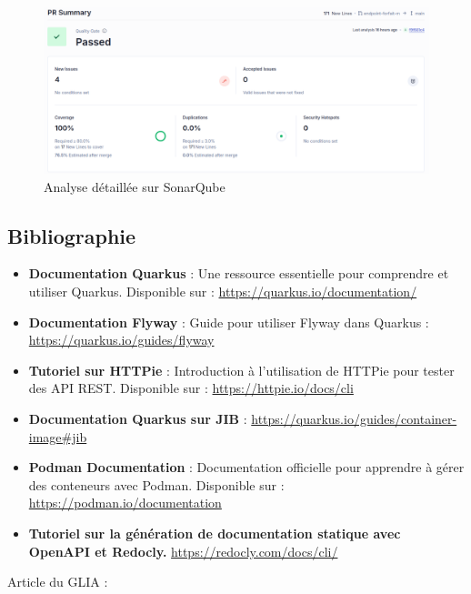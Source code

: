 \documentclass[11pt]{article}
\begin{document}
		\begin{figure}[H] \centering \includegraphics[width=\textwidth]{asset/analyse_sonarq.png} \caption{Analyse détaillée sur SonarQube} \label{fig:sonarq}\end{figure}
		\subsection{Bibliographie}
		\begin{itemize}
			\item \textbf{Documentation Quarkus} : Une ressource essentielle pour comprendre et utiliser Quarkus. Disponible sur : \url{https://quarkus.io/documentation/}
			\item \textbf{Documentation Flyway} : Guide pour utiliser Flyway dans Quarkus : \url{https://quarkus.io/guides/flyway}
			\item \textbf{Tutoriel sur HTTPie} : Introduction à l'utilisation de HTTPie pour tester des API REST. Disponible sur : \url{https://httpie.io/docs/cli}
			\item\textbf{Documentation Quarkus sur JIB} : \url{https://quarkus.io/guides/container-image#jib}
			\item \textbf{Podman Documentation} : Documentation officielle pour apprendre à gérer des conteneurs avec Podman. Disponible sur : \url{https://podman.io/documentation}
			\item \textbf{Tutoriel sur la génération de documentation statique avec OpenAPI et Redocly.} \url{https://redocly.com/docs/cli/} 
		\end{itemize}
		Article du GLIA :
		\sloppy 
\end{document}
